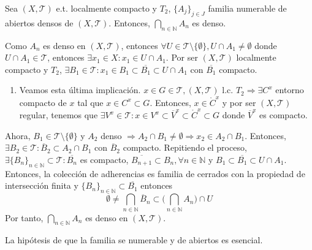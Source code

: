 \begin{theo}[de Baire]
  Sea $( X, \mathcal{T} )$ e.t. localmente compacto y $T_{2}$, $\{ A_{j} \}_{j \in J}$ familia numerable de abiertos densos de $( X, \mathcal{T} )$. Entonces, $\bigcap_{n \in \mathbb{N}} A_{n}$ es denso.
\end{theo}

\begin{dem}
  Como $ A_{n}$ es denso en $( X, \mathcal{T} )$, entonces $\forall U \in \mathcal{T} \setminus \{  \emptyset \}, U \cap A_{1} \neq \emptyset $ donde $U \cap A_{1} \in \mathcal{T}$, entonces $\exists x_{1} \in X : x_{1} \in U \cap A_{1}$. Por ser $( X, \mathcal{T} )$ localmente compacto y $T_{2}$, $ \exists B_{1} \in \mathcal{T} : x_{1} \in B_{1} \subset \overline{B_{1}} \subset U \cap A_{1}$ con $\overline{B_{1}}$ compacto.

  \begin{enumerate}[label=(\roman*)]
    \item [] Veamos esta última implicación. $x \in G \in \mathcal{T}, ( X, \mathcal{T} )$ l.c. $T_{2} \Rightarrow \exists C^{x}$ entorno compacto de $x$ tal que $x \in C^{x} \subset G$. Entonces, $x \in \mathring{C}^{x}$ y por ser $( X, \mathcal{T} )$ regular, tenemos que $\exists V^{x} \in \mathcal{T} : x \in V^{x} \subset \overline{V}^{x} \subset \mathring{C}^{x} \subset G$ donde $\overline{V}^{x}$ es compacto.
  \end{enumerate}

  Ahora, $B_{1} \in \mathcal{T} \setminus \{ \emptyset \}$ y $A_{2}$ denso $\Rightarrow A_{2} \cap B_{1} \neq \emptyset \Rightarrow x_{2} \in A_{2} \cap B_{1}$. Entonces, $\exists B_{2} \in \mathcal{T}: \overline{B}_{2} \subset A_{2} \cap B_{1}$ con $\overline{B}_{2}$ compacto. Repitiendo el proceso, $\exists \{ B_{n} \}_{n \in \mathbb{N}} \subset \mathcal{T} : \overline{B_{n}}$ es compacto, $\overline{B_{n+1}} \subset B_{n}, \forall n \in \mathbb{N}$ y $B_{1} \subset \overline{B_{1}} \subset U \cap A_{1}$. Entonces, la colección de adherencias es familia de cerrados con la propiedad de intersección finita y $\{ B_{n} \}_{n \in \mathbb{N}} \subset \overline{B_{1}}$ entonces
  \[
    \emptyset \neq \bigcap_{n \in \mathbb{N}} \overline{B}_{n} \subset \Big ( \bigcap_{n \in \mathbb{N}} A_{n} \Big ) \cap U
  \]
  Por tanto, $\bigcap_{n \in \mathbb{N}} A_{n}$ es denso en $( X, \mathcal{T} )$.
\end{dem}

\begin{obs}
  La hipótesis de que la familia se numerable y de abiertos es esencial.
\end{obs}

